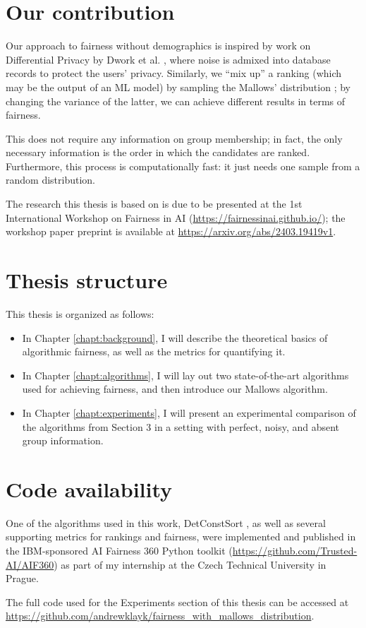 \section{Our contribution}\label{sect:int_4}

Our approach to fairness without demographics is inspired by work on Differential Privacy by Dwork et al. \cite{foundationsofDPDwork}, where noise is admixed into database records to protect the users’ privacy. Similarly, we “mix up” a ranking (which may be the output of an ML model) by sampling the Mallows’ distribution \cite{mallows}; by changing the variance of the latter, we can achieve different results in terms of fairness.

This does not require any information on group membership; in fact, the only necessary information is the order in which the candidates are ranked. Furthermore, this process is computationally fast: it just needs one sample from a random distribution.

The research this thesis is based on is due to be presented at the 1st International Workshop on Fairness in AI (\url{https://fairnessinai.github.io/}); the workshop paper preprint is available at \url{https://arxiv.org/abs/2403.19419v1}.

\section{Thesis structure}\label{sect:structure}

This thesis is organized as follows:

\begin{itemize}
\item In Chapter \ref{chapt:background}, I will describe the theoretical basics of algorithmic fairness, as well as the metrics for quantifying it.
\item In Chapter \ref{chapt:algorithms}, I will lay out two state-of-the-art algorithms used for achieving fairness, and then introduce our Mallows algorithm.
\item In Chapter \ref{chapt:experiments}, I will present an experimental comparison of the algorithms from Section 3 in a setting with perfect, noisy, and absent group information.
\end{itemize}


\section{Code availability}\label{sect:code_availability}

One of the algorithms used in this work, DetConstSort \cite{linkedin}, as well as several supporting metrics for rankings and fairness, were implemented and published in the IBM-sponsored AI Fairness 360 Python toolkit (\href{https://github.com/Trusted-AI/AIF360}{https://github.com/Trusted-AI/AIF360}) as part of my internship at the Czech Technical University in Prague.

The full code used for the Experiments section of this thesis can be accessed at \url{https://github.com/andrewklayk/fairness_with_mallows_distribution}.
